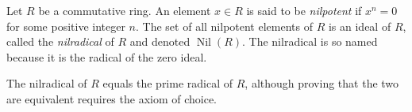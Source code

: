 \documentclass[12pt]{article}
\begin{document}
Let $R$ be a commutative ring. An element $x \in R$ is said to be {\em nilpotent} if $x^n = 0$ for some positive integer $n$. The set of all nilpotent elements of $R$ is an ideal of $R$, called the {\em nilradical} of $R$ and denoted $\operatorname{Nil}(R)$. The nilradical is so named because it is the radical of the zero ideal.

The nilradical of $R$ equals the prime radical of $R$, although proving that the two are equivalent requires the axiom of choice.
\end{document}
